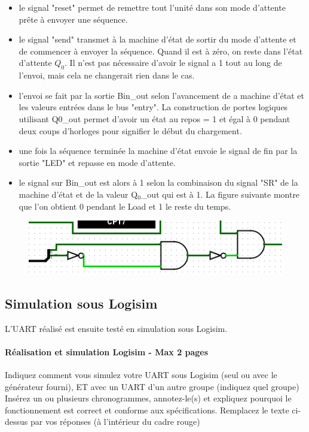 \documentclass[a4paper]{article} %
\begin{document}
\begin{tcolorbox}[colframe=Monokaimagenta,colback=white, breakable, enhanced]
\begin{itemize}
	\item le signal "reset" permet de remettre tout l'unité dans son mode d'attente prête à envoyer une séquence.
	\item le signal "send" transmet à la machine d'état de sortir du mode d'attente et de commencer à envoyer la séquence. Quand il est à zéro, on reste dans l'état d'attente $Q_0$. Il n'est pas nécessaire d'avoir le signal a 1 tout au long de l'envoi, mais cela ne changerait rien dans le cas.
	\item l'envoi se fait par la sortie Bin\_out selon l'avancement de a machine d'état et les valeurs entrées dans le bus "entry". La construction de portes logiques utilisant Q0\_out permet d'avoir un état au repos = 1 et égal à 0 pendant deux coups d'horloges pour signifier le début du chargement.
	\item une fois la séquence terminée la machine d'état envoie le signal de fin par la sortie "LED" et repasse en mode d'attente.
	\item le signal sur Bin\_out est alors à 1 selon la combinaison du signal "SR" de la machine d'état et de la valeur Q$_0$\_out qui est à 1. La figure suivante montre que l'on obtient 0 pendant le Load et 1 le reste du temps.
\end{itemize}
\begin{figure}[H]
	\centering
	\includegraphics[scale=0.5]{src/bin_out_1}
	\label{fig:bin_out_1}
\end{figure}




\end{tcolorbox}
 \subsection{Simulation sous Logisim}
L’UART réalisé est ensuite testé en simulation sous Logisim.
\begin{tcolorbox}[colframe=Monokaimagenta,colback=white, breakable, enhanced]
\paragraph{Réalisation et simulation Logisim - Max 2 pages}
Indiquez comment vous simulez votre UART sous Logisim (seul ou avec le générateur fourni), ET avec un UART d’un autre groupe (indiquez quel groupe)
Insérez un ou plusieurs chronogrammes, annotez-le(s) et expliquez pourquoi le fonctionnement est correct et conforme aux spécifications.
Remplacez le texte ci-dessus par vos réponses (à l’intérieur du cadre rouge)
\\
\end{tcolorbox}
\end{document}
